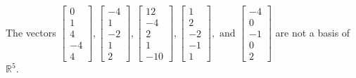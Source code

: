 \begin{exercise}
\begin{exerciseStatement}
  \end{exerciseStatement}
  \begin{exerciseAnswer}
   The vectors \(\left[\begin{array}{r}
0 \\
1 \\
4 \\
-4 \\
4
\end{array}\right] , \left[\begin{array}{r}
-4 \\
1 \\
-2 \\
1 \\
2
\end{array}\right] , \left[\begin{array}{r}
12 \\
-4 \\
2 \\
1 \\
-10
\end{array}\right] , \left[\begin{array}{r}
1 \\
2 \\
-2 \\
-1 \\
1
\end{array}\right] , \text{ and } \left[\begin{array}{r}
-4 \\
0 \\
-1 \\
0 \\
2
\end{array}\right]\) 
  	 are not  a basis of \(\mathbb{R}^5\).
  


  \end{exerciseAnswer}
\end{exercise}